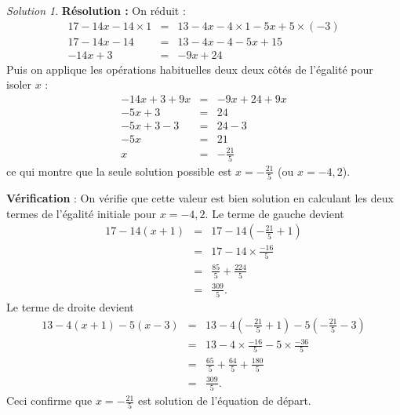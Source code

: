 \documentclass[14pt]{article}
\theoremstyle{remark}
\newtheorem*{sol}{Solution}
\newcounter{n}
\theoremstyle{plain}
\begin{document}
\begin{sol}
\textbf{Résolution :}
On réduit : 
\begin{eqnarray*}
17 - 14x - 14\times 1 &=& 13-4x-4\times 1 -5x+5\times (-3)\\
17-14x-14&=& 13-4x-4-5x+15\\
-14x+3&=& -9x+24 \end{eqnarray*}
Puis on applique les opérations habituelles deux deux côtés de l'égalité pour isoler $x$ : 
\begin{eqnarray*}
-14x+3+9x&=& -9x+24+9x\\
-5x+3&=& 24\\
-5x+3-3&=& 24-3\\
-5x&=& 21\\
x &=& -\frac{21}{5}
\end{eqnarray*}
ce qui montre que la seule solution possible est $x=-\frac{21}{5}$ (ou $x=-4,2$).

\textbf{Vérification} : On vérifie que cette valeur est bien solution en calculant les deux termes de l'égalité initiale pour $x=-4,2$.
Le terme de gauche devient 
\begin{eqnarray*}
17-14(x+1) &=&  17 - 14\left(-\frac{21}5+1\right)\\
&=& 17 - 14\times \frac{-16}5\\
&=& \frac{85}5 + \frac{224}5\\
&=& \frac{309}5.\end{eqnarray*}
Le terme de droite devient 
\begin{eqnarray*}
13-4(x+1)-5(x-3)
&=& 13-4\left(-\frac{21}5+1\right)-5\left(-\frac{21}5-3\right)\\
&=& 13-4\times \frac{-16}5 -5\times\frac{-36}5\\
&=& \frac{65}5 + \frac{64}5 +\frac{180}5\\
&=& \frac{309}5.
\end{eqnarray*}
Ceci confirme que $x=-\frac{21}5$ est solution de l'équation de départ.
\end{sol}
\end{document}

